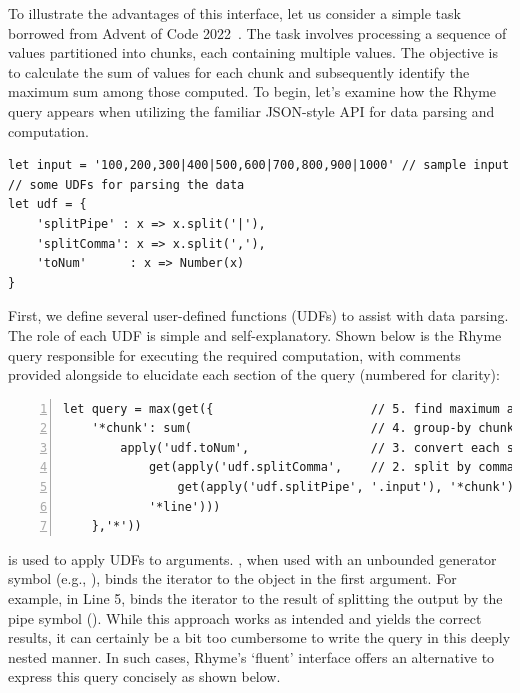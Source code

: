\documentclass[runningheads]{llncs}
\newcommand{\lang}{Rhyme}
\begin{document}
To illustrate the advantages of this interface, let us consider a
simple task borrowed from Advent of Code 2022~\cite{adventofcode22}.
The task involves processing a sequence of values partitioned into chunks,
each containing multiple values.
The objective is to calculate the sum of values for each chunk and
subsequently identify the maximum sum among those computed.
To begin, let's examine how the \lang{} query appears when utilizing
the familiar JSON-style API for data parsing and computation.


\begin{lstlisting}[style=JavaScript, columns=flexible]
let input = '100,200,300|400|500,600|700,800,900|1000' // sample input
// some UDFs for parsing the data
let udf = {
    'splitPipe' : x => x.split('|'),
    'splitComma': x => x.split(','),
    'toNum'      : x => Number(x)
}
\end{lstlisting}

First, we define several user-defined functions (UDFs) to assist with data parsing.
The role of each UDF is simple and self-explanatory.
Shown below is the \lang{} query responsible for executing the required
computation, with comments provided alongside to elucidate each section
of the query (numbered for clarity):

\begin{lstlisting}[style=JavaScript, columns=flexible, numbers=left]
let query = max(get({                      // 5. find maximum among group sums
    '*chunk': sum(                         // 4. group-by chunk and compute sum
        apply('udf.toNum',                 // 3. convert each string number to a number object
            get(apply('udf.splitComma',    // 2. split by comma to get numbers of each chunk
                get(apply('udf.splitPipe', '.input'), '*chunk')), // 1. split into chunks
            '*line')))
    },'*'))
\end{lstlisting}

 is used to apply UDFs to arguments.
, when used with an unbounded generator symbol (e.g., ), binds the
iterator to the object in the first argument.
For example, in Line 5,  binds the iterator
 to the result of splitting the output by the pipe symbol (\inline{|}).
While this approach works as intended and yields the correct results, it can certainly be
a bit too cumbersome to write the query in this deeply nested manner.
In such cases, \lang{}'s `fluent' interface offers an alternative to express
this query concisely as shown below.
\end{document}
